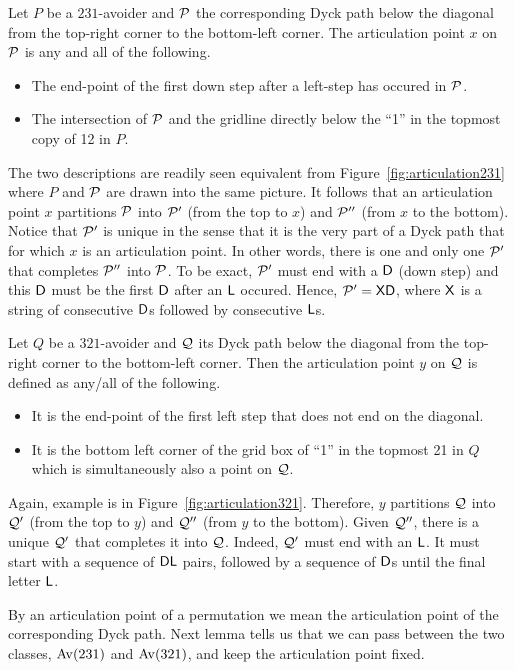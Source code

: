 Let $P$ be a $231$-avoider and $\P$ the corresponding Dyck path below the diagonal from the top-right corner to the bottom-left corner. The articulation point $x$ on $\P$ is any and all of the following.
\begin{itemize}
\item The end-point of the first down step after a left-step has occured in $\P$.
\item The intersection of $\P$ and the gridline directly below the ``1'' in the topmost copy of 12 in $P$.
\end{itemize}
The two descriptions are readily seen equivalent from Figure~\ref{fig:articulation231} where $P$ and $\P$ are drawn into the same picture. It follows that an articulation point $x$ partitions $\P$ into $\P'$ (from the top to $x$) and $\P''$ (from $x$ to the bottom). Notice that $\P'$ is unique in the sense that it is the very part of a Dyck path that for which $x$ is an articulation point. In other words, there is one and only one $\P'$ that completes $\P''$ into $\P$. To be exact, $\P'$ must end with a $\fD$ (down step) and this $\fD$ must be the first $\fD$ after an $\fL$ occured. Hence, $\P' = \fX\fD$, where $\fX$ is a string of consecutive $\fD$s followed by consecutive $\fL$s.

Let $Q$ be a $321$-avoider and $\Q$ its Dyck path below the diagonal from the top-right corner to the bottom-left corner. Then the articulation point $y$ on $\Q$ is defined as any/all of the following.
\begin{itemize}
\item It is the end-point of the first left step that does not end on the diagonal.
\item It is the bottom left corner of the grid box of ``1'' in the topmost 21 in $Q$ which is simultaneously also a point on $\Q$.
\end{itemize}
Again, example is in Figure~\ref{fig:articulation321}. Therefore, $y$ partitions $\Q$ into $\Q'$ (from the top to $y$) and $\Q''$ (from $y$ to the bottom). Given $\Q''$, there is a unique $\Q'$ that completes it into $\Q$. Indeed, $\Q'$ must end with an $\fL$. It must start with a sequence of $\fD\fL$ pairs, followed by a sequence of $\fD$s until the final letter $\fL$.

By an articulation point of a permutation we mean the articulation point of the corresponding Dyck path. Next lemma tells us that we can pass between the two classes, $\Av(231)$ and $\Av(321)$, and keep the articulation point fixed.

